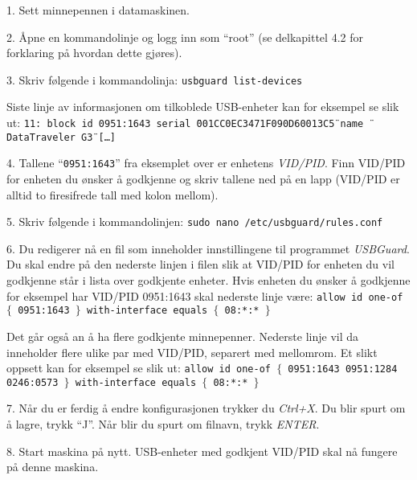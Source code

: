 \item{1.} Sett minnepennen i datamaskinen.
\item{2.} \AA pne en kommandolinje og logg inn som ``root'' (se delkapittel 4.2 for forklaring p\aa{} hvordan dette gj\o res).
\item{3.} Skriv f\o lgende i kommandolinja:
\medskip
{\tt usbguard list-devices}
\medskip
\item{} Siste linje av informasjonen om tilkoblede USB-enheter kan for eksempel se slik ut:
\medskip
{\tt 11: block id 0951:1643 serial \"{}001CC0EC3471F090D60013C5\"{} name \"{}DataTraveler G3\"{} [\dots]}
\medskip
\item{4.} Tallene ``{\tt 0951:1643}'' fra eksemplet over er enhetens {\it VID/PID}. Finn VID/PID for enheten du \o nsker \aa{} godkjenne og skriv tallene ned p\aa{} en lapp (VID/PID er alltid to firesifrede tall med kolon mellom).
\item{5.} Skriv f\o lgende i kommandolinjen:
\medskip
{\tt sudo nano /etc/usbguard/rules.conf}
\medskip
\item{6.} Du redigerer n\aa{} en fil som inneholder innstillingene til programmet {\it USBGuard}. Du skal endre p\aa{} den nederste linjen i filen slik at VID/PID for enheten du vil godkjenne st\aa r i lista over godkjente enheter. Hvis enheten du \o nsker \aa{} godkjenne for eksempel har VID/PID 0951:1643 skal nederste linje v\ae re:
\medskip
{\tt allow id one-of $\{$ 0951:1643 $\}$ with-interface equals $\{$ 08:*:* $\}$ }
\medskip
\item{} Det g\aa r ogs\aa{} an \aa{} ha flere godkjente minnepenner. Nederste linje vil da inneholder flere ulike par med VID/PID, separert med mellomrom. Et slikt oppsett kan for eksempel se slik ut:
\medskip
{\tt allow id one-of $\{$ 0951:1643 0951:1284 0246:0573 $\}$ with-interface equals $\{$ 08:*:* $\}$ }
\medskip
\item{7.} N\aa r du er ferdig \aa{} endre konfigurasjonen trykker du {\it Ctrl+X}. Du blir spurt om \aa{} lagre, trykk ``J''. N\aa r blir du spurt om filnavn, trykk {\it ENTER}.
\item{8.} Start maskina p\aa{} nytt. USB-enheter med godkjent VID/PID skal n\aa{} fungere p\aa{} denne maskina.



\vfill\eject\bye

